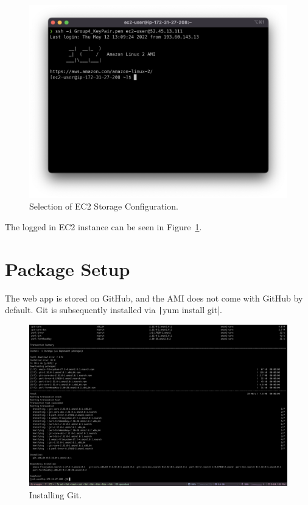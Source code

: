 \begin{figure}[!htbp]
    \centering
    \includegraphics[scale=0.3]{resources/ec2/ec2-logged-in}
    \caption{Selection of EC2 Storage Configuration.}
    \label{fig:ec2-logged-in}
\end{figure}

The logged in EC2 instance can be seen in Figure~\ref{fig:ec2-logged-in}.

\section{Package Setup}\label{sec:web-app-setup}

The web app is stored on GitHub, and the AMI does not come with GitHub by default.
Git is subsequently installed via \texttt|yum install git|.

\begin{figure}[!htbp]
    \centering
    \includegraphics[scale=0.3]{resources/ec2/installing-git}
    \caption{Installing Git.}
    \label{fig:webapp-git}
\end{figure}

